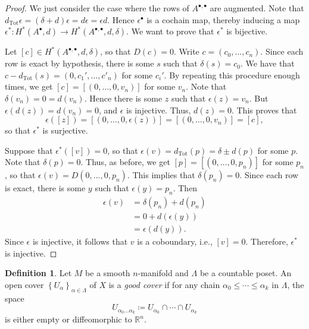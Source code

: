 \documentclass[10pt,letterpaper,cm]{nupset}
\theoremstyle{definition}
\newtheorem{definition}{Definition}[subsection]
\theoremstyle{theorem}
\theoremstyle{remark}
\newcommand{\R}{\mathbb{R}}
\newcommand{\1}{\mathbb{1}}
\newcommand{\0}{\vec 0}
\DeclareMathOperator{\tot}{Tot}
\begin{document}
\begin{proof}
We just consider the case where the rows of $A^{\bullet, \bullet}$ are augmented. Note that $d_{\tot}{\epsilon} = \left(\delta + d\right){\epsilon} = d{\epsilon} = \epsilon{d}$. Hence $\epsilon^{\bullet}$ is a cochain map, thereby inducing a map $\epsilon^{\ast} : H^{\ast}(A^{\bullet}, d) \to H^{\ast}(A^{\bullet, \bullet}, d, \delta)$. We want to prove that $\epsilon^{\ast}$ is bijective. 

\medskip


Let $\left[c\right] \in H^{\ast}(A^{\bullet, \bullet}, d, \delta)$, so that $D(c) =0$. Write $c= \left(c_0, \ldots, c_n\right)$. Since each row is exact by hypothesis, there is some $s$ such that $\delta(s) = c_0$. We have that $c- d_{\tot}(s) = \left(0, c_1', \ldots, c'_n\right)$ for some $c_i'$. By repeating this procedure enough times, we get $\left[c\right] = \left[\left(0, \ldots, 0, v_n\right)\right]$ for some $v_n$. Note that $\delta(v_n) =0 = d(v_n)$. Hence there is some $z$ such that $\epsilon(z) = v_n$.   But $\epsilon(d(z)) = d(v_n) =0$, and $\epsilon$ is injective. Thus, $d(z) =0$. This proves that $$\epsilon([z]) = \left[\left(0, \ldots, 0, \epsilon(z)\right)\right]  = \left[\left(0, \ldots, 0, v_n\right)\right] = \left[c\right],$$ so that $\epsilon^{\ast}$ is surjective.

\medskip

 Suppose that $\epsilon^{\ast}([v]) =0$, so that  $\epsilon(v) = d_{\tot}(p) = \delta \pm d(p)$ for some $p$. Note that $\delta(p) =0$. Thus, as before, we get $\left[p\right] = \left[\left(0, \ldots, 0, p_n\right)\right]$ for some $p_n$, so that $\epsilon(v) = D(0, \ldots, 0, p_n)$. This implies that $\delta(p_n) =0$. Since each row is exact, there is some $y$ such that $\epsilon(y) = p_n$. Then 
\begin{align*}
\epsilon(v) & = \delta(p_n) +d(p_n) 
\\ &= 0 + d(\epsilon(y))
\\ & =  \epsilon(d(y)).
\end{align*}
Since $\epsilon$ is injective, it follows that $v$ is a coboundary, i.e., $[v]=0$. Therefore, $\epsilon^{\ast}$ is injective. 
\end{proof}

\begin{definition}
Let $M$ be a smooth $n$-manifold and $\Lambda$ be a countable poset. An open cover $\left\{U_{\alpha}\right\}_{\alpha \in \Lambda}$ of $X$ is a \textit{good cover} if for any chain $\alpha_0\leq \cdots \leq \alpha_k$ in $\Lambda$, the space $$U_{\alpha_0\ldots \alpha_k}\coloneqq  U_{\alpha_0} \cap \cdots \cap U_{\alpha_k}$$ is either empty or diffeomorphic to $\R^n$.
\end{definition}
\end{document}

